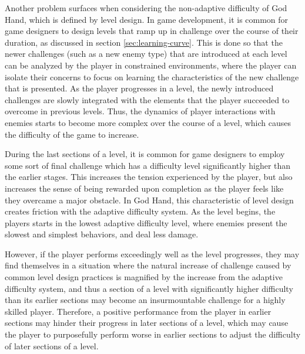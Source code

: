 Another problem surfaces when considering the non-adaptive difficulty of God Hand, which is defined by level design. In game development, it is common for game designers to design levels that ramp up in challenge over the course of their duration, as discussed in section \ref{sec:learning-curve}. This is done so that the newer challenges (such as a new enemy type) that are introduced at each level can be analyzed by the player in constrained environments, where the player can isolate their concerns to focus on learning the characteristics of the new challenge that is presented. As the player progresses in a level, the newly introduced challenges are slowly integrated with the elements that the player succeeded to overcome in previous levels. Thus, the dynamics of player interactions with enemies starts to become more complex over the course of a level, which causes the difficulty of the game to increase.

During the last sections of a level, it is common for game designers to employ some sort of final challenge which has a difficulty level significantly higher than the earlier stages. This increases the tension experienced by the player, but also increases the sense of being rewarded upon completion as the player feels like they overcame a major obstacle. In God Hand, this characteristic of level design creates friction with the adaptive difficulty system. As the level begins, the players starts in the lowest adaptive difficulty level, where enemies present the slowest and simplest behaviors, and deal less damage.

However, if the player performs exceedingly well as the level progresses, they may find themselves in a situation where the natural increase of challenge caused by common level design practices is magnified by the increase from the adaptive difficulty system, and thus a section of a level with significantly higher difficulty than its earlier sections may become an insurmountable challenge for a highly skilled player. Therefore, a positive performance from the player in earlier sections may hinder their progress in later sections of a level, which may cause the player to purposefully perform worse in earlier sections to adjust the difficulty of later sections of a level.

